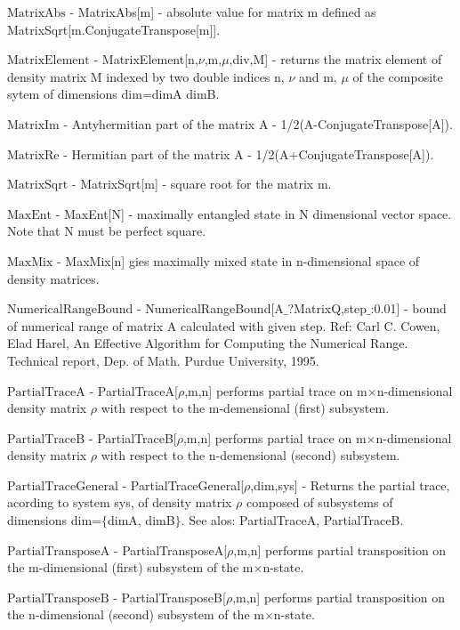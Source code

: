 \documentclass[a4paper,12pt]{article}
\begin{document}
\textbf{$ \text{MatrixAbs} $ } - MatrixAbs[m] - absolute value for matrix m defined as MatrixSqrt[m.ConjugateTranspose[m]].$  $

\textbf{$ \text{MatrixElement} $ } - MatrixElement[n,$\nu $,m,$\mu $,div,M] - returns the matrix element of density matrix M indexed by two double indices n, $\nu $ and m, $\mu $ of the composite sytem of dimensions dim=dimA dimB.$  $

\textbf{$ \text{MatrixIm} $ } - Antyhermitian part of the matrix A - 1/2(A-ConjugateTranspose[A]).$  $

\textbf{$ \text{MatrixRe} $ } - Hermitian part of the matrix A - 1/2(A+ConjugateTranspose[A]).$  $

\textbf{$ \text{MatrixSqrt} $ } - MatrixSqrt[m] - square root for the matrix m.$  $

\textbf{$ \text{MaxEnt} $ } - MaxEnt[N] - maximally entangled state in N dimensional vector space. Note that N must be perfect square.$  $

\textbf{$ \text{MaxMix} $ } - MaxMix[n] gies maximally mixed state in n-dimensional space of density matrices.$  $

\textbf{$ \text{NumericalRangeBound} $ } - NumericalRangeBound[A$\_$?MatrixQ,step$\_$:0.01] - bound of numerical range of matrix A calculated with given step. Ref: Carl C. Cowen, Elad Harel, An Effective Algorithm for Computing the Numerical Range. Technical report, Dep. of Math. Purdue University, 1995.$  $

\textbf{$ \text{PartialTraceA} $ } - PartialTraceA[$\rho $,m,n] performs partial trace on m$\times $n-dimensional density matrix $\rho $ with respect to the m-demensional (first) subsystem.$  $

\textbf{$ \text{PartialTraceB} $ } - PartialTraceB[$\rho $,m,n] performs partial trace on m$\times $n-dimensional density matrix $\rho $ with respect to the n-demensional (second) subsystem.$  $

\textbf{$ \text{PartialTraceGeneral} $ } - PartialTraceGeneral[$\rho $,dim,sys] - Returns the partial trace, acording to system sys, of density matrix $\rho $ composed of subsystems of dimensions dim=$\{$dimA, dimB$\}$. See alos: PartialTraceA, PartialTraceB.$  $

\textbf{$ \text{PartialTransposeA} $ } - PartialTransposeA[$\rho $,m,n] performs partial transposition on the m-dimensional (first) subsystem of the m$\times $n-state.$  $

\textbf{$ \text{PartialTransposeB} $ } - PartialTransposeB[$\rho $,m,n] performs partial transposition on the n-dimensional (second) subsystem of the m$\times $n-state.$  $
\end{document}
